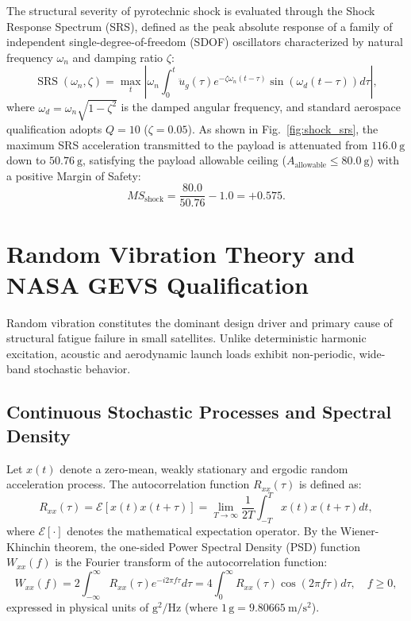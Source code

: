 The structural severity of pyrotechnic shock is evaluated through the Shock Response Spectrum (SRS), defined as the peak absolute response of a family of independent single-degree-of-freedom (SDOF) oscillators characterized by natural frequency $\omega_n$ and damping ratio $\zeta$:
\begin{equation}
\operatorname{SRS}(\omega_n, \zeta) = \max_{t} \left| \omega_n \int_{0}^{t} \ddot{u}_g(\tau) e^{-\zeta \omega_n (t-\tau)} \sin\left(\omega_d (t-\tau)\right) d\tau \right|,
\label{eq:srs_definition}
\end{equation}
where $\omega_d = \omega_n \sqrt{1 - \zeta^2}$ is the damped angular frequency, and standard aerospace qualification adopts $Q = 10$ ($\zeta = 0.05$). As shown in Fig.~\ref{fig:shock_srs}, the maximum SRS acceleration transmitted to the payload is attenuated from $\SI{116.0}{\text{g}}$ down to $\SI{50.76}{\text{g}}$, satisfying the payload allowable ceiling ($A_{\text{allowable}} \le \SI{80.0}{\text{g}}$) with a positive Margin of Safety:
\begin{equation}
MS_{\text{shock}} = \frac{80.0}{50.76} - 1.0 = +0.575.
\end{equation}

\section{Random Vibration Theory and NASA GEVS Qualification}
\label{sec:random_vibration_theory}

Random vibration constitutes the dominant design driver and primary cause of structural fatigue failure in small satellites. Unlike deterministic harmonic excitation, acoustic and aerodynamic launch loads exhibit non-periodic, wide-band stochastic behavior.

\subsection{Continuous Stochastic Processes and Spectral Density}

Let $x(t)$ denote a zero-mean, weakly stationary and ergodic random acceleration process. The autocorrelation function $R_{xx}(\tau)$ is defined as:
\begin{equation}
R_{xx}(\tau) = \mathcal{E}[x(t) x(t+\tau)] = \lim_{T \to \infty} \frac{1}{2T} \int_{-T}^{T} x(t) x(t+\tau) dt,
\label{eq:autocorrelation}
\end{equation}
where $\mathcal{E}[\cdot]$ denotes the mathematical expectation operator. By the Wiener-Khinchin theorem, the one-sided Power Spectral Density (PSD) function $W_{xx}(f)$ is the Fourier transform of the autocorrelation function:
\begin{equation}
W_{xx}(f) = 2 \int_{-\infty}^{\infty} R_{xx}(\tau) e^{-i 2\pi f \tau} d\tau = 4 \int_{0}^{\infty} R_{xx}(\tau) \cos(2\pi f \tau) d\tau, \quad f \ge 0,
\label{eq:wiener_khinchin}
\end{equation}
expressed in physical units of $\text{g}^2/\text{Hz}$ (where $1\,\text{g} = \SI{9.80665}{\meter/\second^2}$).

